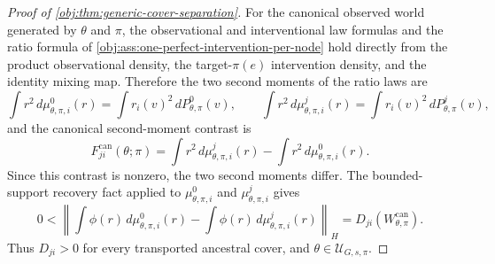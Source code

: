 \begin{proof}[Proof of \cref{obj:thm:generic-cover-separation}]
For the canonical observed world generated by \(\theta\) and \(\pi\), the
observational and interventional law formulas and the ratio formula of
\cref{obj:ass:one-perfect-intervention-per-node} hold directly from the product
observational density, the target-\(\pi(e)\) intervention density, and the
identity mixing map.  Therefore the two second moments of the ratio laws are
\[
\int r^2\,d\mu^0_{\theta,\pi,i}(r)
=
\int r_i(v)^2\,dP^0_{\theta,\pi}(v),
\qquad
\int r^2\,d\mu^j_{\theta,\pi,i}(r)
=
\int r_i(v)^2\,dP^j_{\theta,\pi}(v),
\]
and the canonical second-moment contrast is
\[
F^{\mathrm{can}}_{ji}(\theta;\pi)
=
\int r^2\,d\mu^j_{\theta,\pi,i}(r)
-
\int r^2\,d\mu^0_{\theta,\pi,i}(r).
\]
Since this contrast is nonzero, the two second moments differ.  The
bounded-support recovery fact applied to
\(\mu^0_{\theta,\pi,i}\) and \(\mu^j_{\theta,\pi,i}\) gives
\[
0<
\left\|
\int \phi(r)\,d\mu^0_{\theta,\pi,i}(r)
-
\int \phi(r)\,d\mu^j_{\theta,\pi,i}(r)
\right\|_H
=
D_{ji}\!\left(W_{\theta,\pi}^{\mathrm{can}}\right).
\]
Thus \(D_{ji}>0\) for every transported ancestral cover, and
\(\theta\in\mathcal U_{G,s,\pi}\). %


\end{proof}
